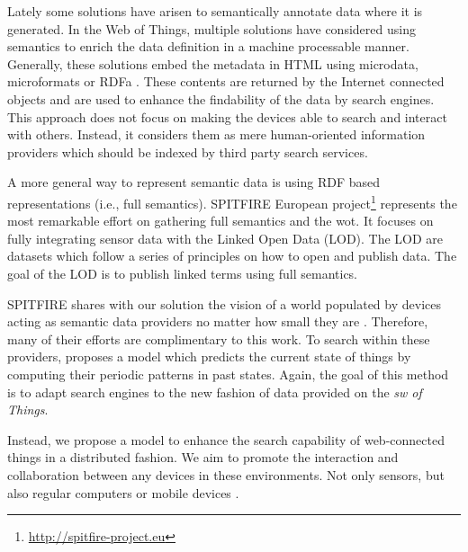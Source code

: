 

Lately some solutions have arisen to semantically annotate data where it is generated. %
In the Web of Things, multiple solutions have considered using semantics to enrich the data definition in a machine processable manner.
Generally, these solutions embed the metadata in HTML using microdata, microformats or RDFa \citep{mayer_extensible_2011}.
These contents are returned by the Internet connected objects and are used to enhance the findability of the data by search engines.
This approach does not focus on making the devices able to search and interact with others.
Instead, it considers them as mere human-oriented information providers which should be indexed by third party search services.

A more general way to represent semantic data is using RDF based representations (i.e., full semantics).
SPITFIRE European project\footnote{\url{http://spitfire-project.eu}} represents the most remarkable effort on gathering full semantics and the \ac{wot}.
It focuses on fully integrating sensor data with the Linked Open Data (LOD). 
The LOD are datasets which follow a series of principles on how to open and publish data.
The goal of the LOD is to publish linked terms using full semantics.

SPITFIRE shares with our solution the vision of a world populated by devices acting as semantic data providers no matter how small they are \citep{hasemann_rdf_2012}.
Therefore, many of their efforts are complimentary to this work.
To search within these providers, \citet{pfisterer_spitfire:_2011} proposes a model which predicts the current state of things by computing their periodic patterns in past states.
Again, the goal of this method is to adapt search engines to the new fashion of data provided on the \emph{\acl{sw} of Things}.

Instead, we propose a model to enhance the search capability of web-connected things in a distributed fashion.
We aim to promote the interaction and collaboration between any devices in these environments.
Not only sensors, but also regular computers or mobile devices \citep{balandin_access_2011}.